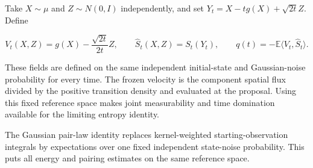\documentclass[11pt,a4paper]{article}
\begin{document}
Take \(X\sim\mu\) and \(Z\sim N(0,I)\) independently, and set \(Y_t=X-tg(X)+\sqrt{2t}Z\). Define

\[V_t(X,Z)=g(X)-\frac{\sqrt{2t}}{2t}Z,\qquad \widehat S_t(X,Z)=S_t(Y_t),\qquad q(t)=-\mathbb E\langle V_t,\widehat S_t\rangle.\]

These fields are defined on the same independent initial-state and Gaussian-noise probability for every time. The frozen velocity is the component spatial flux divided by the positive transition density and evaluated at the proposal. Using this fixed reference space makes joint measurability and time domination available for the limiting entropy identity.



The Gaussian pair-law identity replaces kernel-weighted starting-observation integrals by expectations over one fixed independent state-noise probability. This puts all energy and pairing estimates on the same reference space.
\end{document}

